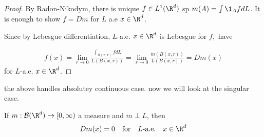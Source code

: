 \begin{proof}
	By Radon-Nikodym, there is unique $f \in L^1(\R^d)$ sp $m(A) = \int \1_A f dL$.
	It is enough to show  $f = D m$ for $L$ a.e $x \in \R^d$.

	Since  by Lebesgue differentiation, $L$-a.e. $x \in \R^d$ is Lebesgue for $f,$ have

	\begin{align*}
		f(x) = \lim_{r \to 0} \frac{\int_{B(x, r)} f dL}{L(B(x,r))} = \lim_{r \to 0} \frac{m(B(x,r))}{L(B(x,r))} = D m(x)
	\end{align*}
	for $L$-a.e. $x \in \R^d$.
\end{proof}

\begin{remark}
	the above handles absolutey continuous case. now we will  look at the singular case.
\end{remark}


\begin{theorem}
	If $m : \mathcal{B}(\R^d) \to [0,\infty)$ a measure and $m \perp L$, then
	\begin{align*}
		D m(x) = 0 \quad \text{for} \quad L \text{-a.e.} \quad x \in \R^d
	\end{align*}
\end{theorem}

